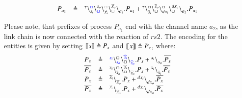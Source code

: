 \begin{example}
\[\begin{array}{lcl}
 P_{a_1}&\defeq &
\startchain{\silent}\chainedlink{s_i}{{\color{blue}\noact}}\chainedlink{{\color{blue}\noact}}{s_o}\chainedlink{\widetilde{x}_i}{{\color{gray}\noact}}\chainedlink{{\color{gray}\noact}}{\widetilde{x}_o}\chainend{a_2}.P_{a_1} +
\startchain{\silent}\chainedlink{\overline{s}_i}{\noact}\chainedlink{\noact}{\overline{s}_o}    \chainedlink{dx_i}{\noact}\chainedlink{\noact}{dx_o}\chainend{a_2}.P_{a_1}\\
%
\end{array}
\]

\noindent
Please note, that prefixes of process $P_{a_1}$ end with the channel name $a_2$, as the link chain is now connected with the  reaction of  $rs2$.
The encoding
for the entities is given by setting $\llbracket s \rrbracket \triangleq P_{s}$ and $\llbracket x \rrbracket \triangleq  P_{x}$, where:
\[
\begin{array}{lcl}
P_{s} &\defeq & \startchain{{\color{blue}s_i}}\chainedlink{{\color{blue}s_o}}{\noact}\chainedlink{\noact}{{\color{blue}\widehat{s}_i}}\chainend{{\color{blue}\widehat{s}_o}}.P_{s} + \startchain{s_i}\chainend{s_o}.\overline{P_{s}}\\
\overline{P_{s}}&\defeq &\startchain{\overline{s}_i}\chainedlink{\overline{s}_o}{\noact}\chainedlink{\noact}{\widehat{s}_i}\chainend{\widehat{s}_o}.P_{s}+\startchain{\overline{s}_i}\chainend{\overline{s}_i}.\overline{P_{s}}\\
P_{x}& \defeq &\startchain{\widetilde{x}_i}\chainend{\widetilde{x}_o}.P_{x} +  \startchain{dx_i}\chainend{dx_o}.\overline{P_{x}}\\
\overline{P_{x}}&\defeq &\startchain{{\color{gray}\widetilde{x}_i}}\chainend{{\color{gray}\widetilde{x}_o}}.P_{x} +  \startchain{dx_i}\chainend{dx_o}.\overline{P_{x}}\\
%


\end{array}\]
\end{example}
